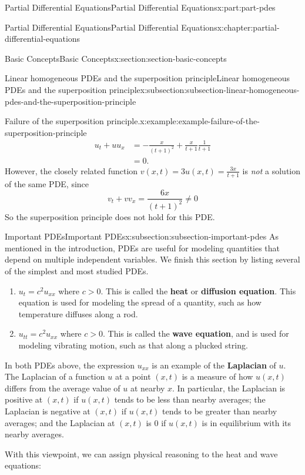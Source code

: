 \documentclass[twoside,10pt,]{book}
\newcommand{\terminology}[1]{\textbf{#1}}
\numberwithin{equation}{part}
\newcommand{\gt}{>}
\newcommand{\amp}{&}
\begin{document}
\begin{partptx}{Partial Differential Equations}{}{Partial Differential Equations}{}{}{x:part:part-pdes}
\begin{chapterptx}{Partial Differential Equations}{}{Partial Differential Equations}{}{}{x:chapter:partial-differential-equations}
\begin{sectionptx}{Basic Concepts}{}{Basic Concepts}{}{}{x:section:section-basic-concepts}
\begin{subsectionptx}{Linear homogeneous PDEs and the superposition principle}{}{Linear homogeneous PDEs and the superposition principle}{}{}{x:subsection:subsection-linear-homogeneous-pdes-and-the-superposition-principle}
\begin{example}{Failure of the superposition principle.}{x:example:example-failure-of-the-superposition-principle}
\begin{align*}
u_{t} + uu_{x} \amp = -\frac{x}{(t+1)^{2}} + \frac{x}{t+1}\frac{1}{t+1} \\
\amp = 0 \text{.}
\end{align*}
However, the closely related function \(v(x,t) = 3u(x,t) = \frac{3x}{t+1}\) is \emph{not} a solution of the same PDE, since%
\begin{equation*}
v_{t}+vv_{x} = \frac{6x}{(t+1)^{2}}\neq0
\end{equation*}
So the superposition principle does not hold for this PDE.%
\end{example}
\end{subsectionptx}
%
%
\typeout{************************************************}
\typeout{************************************************}
%
\begin{subsectionptx}{Important PDEs}{}{Important PDEs}{}{}{x:subsection:subsection-important-pdes}
As mentioned in the introduction, PDEs are useful for modeling quantities that depend on multiple independent variables. We finish this section by listing several of the simplest and most studied PDEs.%
%
\begin{enumerate}
\item{}\(u_{t} = c^{2}u_{xx}\) where \(c\gt0\). This is called the \terminology{heat} or \terminology{diffusion equation}. This equation is used for modeling the spread of a quantity, such as how temperature diffuses along a rod.%
\item{}\(u_{tt} = c^{2}u_{xx}\) where \(c\gt0\). This is called the \terminology{wave equation}, and is used for modeling vibrating motion, such as that along a plucked string.%
\end{enumerate}
In both PDEs above, the expression \(u_{xx}\) is an example of the \terminology{Laplacian} of \(u\). The Laplacian of a function \(u\) at a point \((x,t)\) is a measure of how \(u(x,t)\) differs from the average value of \(u\) at nearby \(x\). In particular, the Laplacian is positive at \((x,t)\) if \(u(x,t)\) tends to be less than nearby averages; the Laplacian is negative at \((x,t)\) if \(u(x,t)\) tends to be greater than nearby averages; and the Laplacian at \((x,t)\) is \(0\) if \(u(x,t)\) is in equilibrium with its nearby averages.%
\par
With this viewpoint, we can assign physical reasoning to the heat and wave equations:%
\begin{enumerate}

\end{enumerate}
\end{subsectionptx}
\end{sectionptx}
\end{chapterptx}
\end{partptx}
\end{document}
